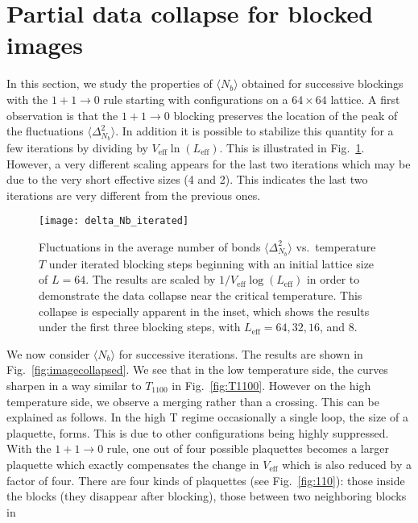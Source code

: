 \documentclass[../main.tex]{subfiles}
\begin{document}
\section{Partial data collapse for blocked images}%
\label{sec:collapse}
In this section, we study the properties of $\langle N_b\rangle$  obtained for
successive blockings with the $1+1\rightarrow0$ rule starting with
configurations on a $64\times64$ lattice.
%
A first observation is that the $1+1\rightarrow0$ blocking preserves the
location of the peak of the fluctuations $\langle\Delta_{N_b}^2\rangle$.
%
 In addition it is possible to stabilize this quantity for a few iterations by
dividing by $V_{\mathrm{eff}}\ln(L_{\mathrm{eff}})$.
%
This is illustrated in Fig.~\ref{fig:delta_Nb_iterated}.
%
However, a very different scaling appears for the last two iterations which may
be due to the very short effective sizes (4 and 2).
%
This indicates the last two iterations are very different from the previous
ones. 
%
\begin{figure}[htpb]
    \centering
    \texttt{[image: delta\_Nb\_iterated]}\hfill
    \caption{Fluctuations in the average number of bonds $\langle
      \Delta_{N_b}^2\rangle$ vs.\ temperature $T$ under iterated blocking steps
      beginning with an initial lattice size of $L = 64$. The results are
      scaled by $1 / V_{\mathrm{eff}}\log(L_{\mathrm{eff}})$ in order to
      demonstrate the data collapse near the critical temperature. This
      collapse is especially apparent in the inset, which shows the results
      under the first three blocking steps, with $L_{\mathrm{eff}} = 64, 32,
      16$, and $8$.}%
\label{fig:delta_Nb_iterated}
\end{figure}
%
We now consider $\langle N_b\rangle$ for successive iterations.
%
The results are shown in Fig.~\ref{fig:imagecollapsed}.
%
We see that in the low temperature side, the curves sharpen in a way similar to
$T_{1100}$ in Fig.~\ref{fig:T1100}.
%
However on the high temperature side, we observe a merging rather than a
crossing.
%
This can be explained as follows.
%
In the high T regime occasionally a single loop, the size of a plaquette,
forms.
%
This is due to other configurations being highly suppressed.
%
With the $1+1\rightarrow0$ rule, one out of four possible plaquettes becomes a
larger plaquette which exactly compensates the change in $V_{\mathrm{eff}}$
which is also reduced by a factor of four.
%
There are four kinds of plaquettes (see Fig.~\ref{fig:110}): those inside the
blocks (they disappear after blocking), those between two neighboring blocks in
\end{document}
